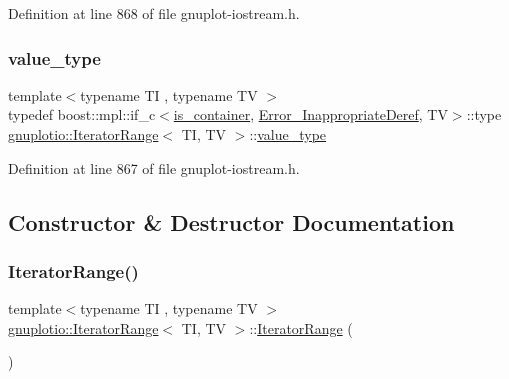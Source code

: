 Definition at line 868 of file gnuplot-\/iostream.\+h.

\mbox{\label{classgnuplotio_1_1_iterator_range_a3d997739282df372a894c586c64a0687}} 
\subsubsection{\texorpdfstring{value\+\_\+type}{value\_type}}
{\footnotesize\ttfamily template$<$typename TI , typename TV $>$ \\
typedef boost\+::mpl\+::if\+\_\+c$<$\hyperlink{classgnuplotio_1_1_iterator_range_a3f79d84bdf18761b6e49ae54d050f8ff}{is\+\_\+container}, \hyperlink{structgnuplotio_1_1_error___inappropriate_deref}{Error\+\_\+\+Inappropriate\+Deref}, TV$>$\+::type \hyperlink{classgnuplotio_1_1_iterator_range}{gnuplotio\+::\+Iterator\+Range}$<$ TI, TV $>$\+::\hyperlink{classgnuplotio_1_1_iterator_range_a3d997739282df372a894c586c64a0687}{value\+\_\+type}}



Definition at line 867 of file gnuplot-\/iostream.\+h.



\subsection{Constructor \& Destructor Documentation}
\mbox{\label{classgnuplotio_1_1_iterator_range_aa5789bb82a999548d3e5fc359a4c0c43}} 
\subsubsection{\texorpdfstring{Iterator\+Range()}{IteratorRange()}\hspace{0.1cm}{\footnotesize\ttfamily [1/2]}}
{\footnotesize\ttfamily template$<$typename TI , typename TV $>$ \\
\hyperlink{classgnuplotio_1_1_iterator_range}{gnuplotio\+::\+Iterator\+Range}$<$ TI, TV $>$\+::\hyperlink{classgnuplotio_1_1_iterator_range}{Iterator\+Range} (\begin{DoxyParamCaption}{ }\end{DoxyParamCaption})\hspace{0.3cm}{\ttfamily [inline]}}



